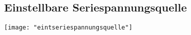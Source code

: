 \subsection{Einstellbare Seriespannungsquelle}
\begin{minipage}[t]{0.3\textwidth}
	\vspace{0pt}								%
	\texttt{[image: "eintseriespannungsquelle"]}
\end{minipage}\hspace{0.05\textwidth}
\begin{minipage}[t]{0.65\textwidth}
	\vspace{0pt}								%
	
\end{minipage}
\vspace{2mm}